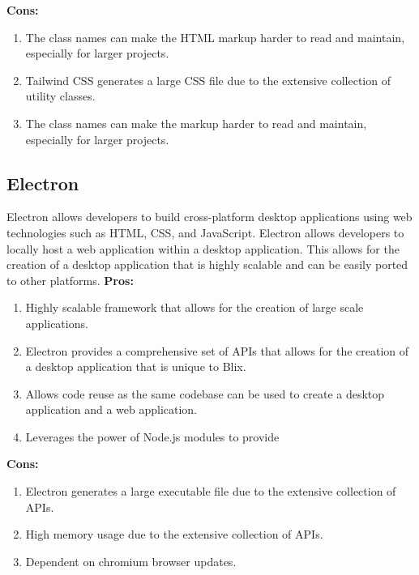 \documentclass[11pt,a4paper]{article}
\begin{document}
\textbf{Cons:}
\begin{enumerate}[label*=\arabic*.]
	\item[\textbullet] The class names can make the HTML markup harder to read
	and maintain, especially for larger projects.
	\item[\textbullet] Tailwind CSS generates a large CSS file due to the
	extensive collection of utility classes. 
	\item[\textbullet] The class names can make the markup harder to read and
	maintain, especially for larger projects.
\end{enumerate}

\subsection{Electron}

Electron allows developers to build cross-platform desktop applications using
web technologies such as HTML, CSS, and JavaScript. Electron allows developers
to locally host a web application within a desktop application. This allows for
the creation of a desktop application that is highly scalable and can be easily
ported to other platforms.
\textbf{Pros:}

\begin{enumerate}[label*=\arabic*.]
	\item[\textbullet] Highly scalable framework that allows for the creation of
	large scale applications.
	\item[\textbullet] Electron provides a comprehensive set of APIs that allows
	for the creation of a desktop application that is unique to Blix.
	\item[\textbullet] Allows code reuse as the same codebase can be used to
	create a desktop application and a web application.
	\item[\textbullet] Leverages the power of Node.js modules to provide 
\end{enumerate}

\textbf{Cons:}

\begin{enumerate}[label*=\arabic*.]
	\item[\textbullet] Electron generates a large executable file due to the
	extensive collection of APIs.
	\item[\textbullet] High memory usage due to the extensive collection of
	APIs.
	\item[\textbullet] Dependent on chromium browser updates.
\end{enumerate}
\end{document}
